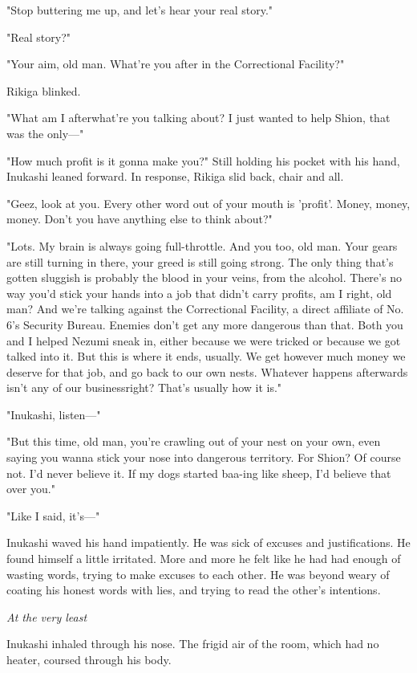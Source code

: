 "Stop buttering me up, and let's hear your real story."

"Real story?"

"Your aim, old man. What're you after in the Correctional Facility?"

Rikiga blinked.

"What am I after\el what're you talking about? I just wanted to help
Shion, that was the only---"

"How much profit is it gonna make you?" Still holding his pocket with
his hand, Inukashi leaned forward. In response, Rikiga slid back, chair
and all.

"Geez, look at you. Every other word out of your mouth is 'profit'.
Money, money, money. Don't you have anything else to think about?"

"Lots. My brain is always going full-throttle. And you too, old man.
Your gears are still turning in there, your greed is still going strong.
The only thing that's gotten sluggish is probably the blood in your
veins, from the alcohol. There's no way you'd stick your hands into a
job that didn't carry profits, am I right, old man? And we're talking
against the Correctional Facility, a direct affiliate of No. 6's
Security Bureau. Enemies don't get any more dangerous than that. Both
you and I helped Nezumi sneak in, either because we were tricked or
because we got talked into it. But this is where it ends, usually. We
get however much money we deserve for that job, and go back to our own
nests. Whatever happens afterwards isn't any of our business\el right?
That's usually how it is."

"Inukashi, listen---"

"But this time, old man, you're crawling out of your nest on your own,
even saying you wanna stick your nose into dangerous territory. For
Shion? Of course not. I'd never believe it. If my dogs started baa-ing
like sheep, I'd believe that over you."

"Like I said, it's---"

Inukashi waved his hand impatiently. He was sick of excuses and
justifications. He found himself a little irritated. More and more he
felt like he had had enough of wasting words, trying to make excuses to
each other. He was beyond weary of coating his honest words with lies,
and trying to read the other's intentions.

\emph{At the very least\el }

Inukashi inhaled through his nose. The frigid air of the room, which had
no heater, coursed through his body.

